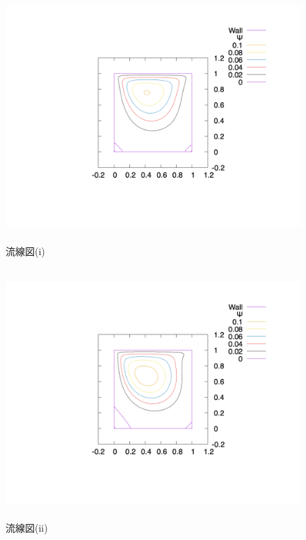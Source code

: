 \documentclass[upLaTeX,a4paper]{jsarticle}
\begin{document}
\begin{figure}[H]
  \centering
  \includegraphics[height=9.5cm, clip, trim=0 200 0 0]{outputs/img/stream_line_re50.png}
  \caption{流線図(i)}
  \label{fig:velocity_vector_re50}
\end{figure}
\begin{figure}[H]
  \centering
  \includegraphics[height=9.5cm, clip, trim=0 200 0 0]{outputs/img/stream_line_re200.png}
  \caption{流線図(ii)}
  \label{fig:velocity_vector_re200}
\end{figure}
\end{document}
